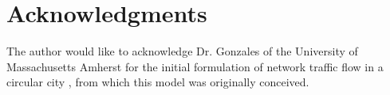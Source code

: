 \documentclass{elsarticle}\usepackage[]{graphicx}\usepackage[]{color}
\begin{document}
\section*{Acknowledgments}
The author would like to acknowledge Dr. Gonzales of the University of Massachusetts Amherst for the initial formulation of network traffic flow in a circular city \citep{Gonzales2015,Fournier2018a, Fournier2019}, from which this model was originally conceived.

% 

\end{document}
